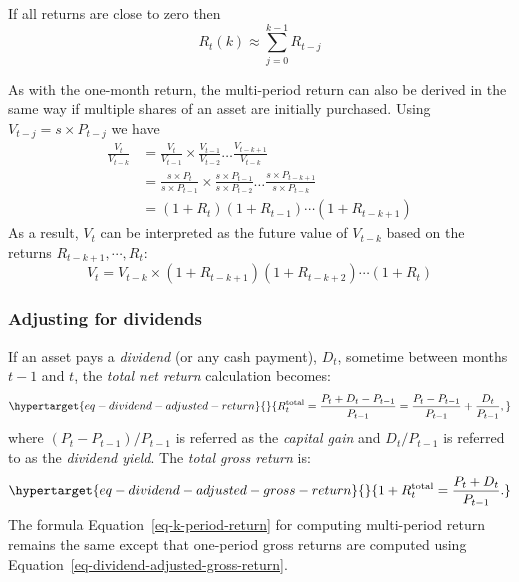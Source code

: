 \documentclass[
  letterpaper,
  DIV=11,
  numbers=noendperiod]{scrreprt}
\theoremstyle{definition}
\theoremstyle{definition}
\theoremstyle{remark}
\begin{document}
If all returns are close to zero then
\[R_{t}(k) \approx \sum_{j=0}^{k-1} R_{t-j}\]

As with the one-month return, the multi-period return can also be
derived in the same way if multiple shares of an asset are initially
purchased. Using \(V_{t-j} = s \times P_{t-j}\) we have \begin{align}
\frac{V_{t}}{V_{t-k}} &= \frac{V_{t}}{V_{t-1}} \times \frac{V_{t-1}}{V_{t-2}} \ldots \frac{V_{t-k+1}}{V_{t-k}} \\
&= \frac{s\times P_{t}}{s\times P_{t-1}} \times \frac{s\times P_{t-1}}{s\times P_{t-2}} \ldots \frac{s\times P_{t-k+1}}{s\times P_{t-k}} \\
&= (1+R_{t})(1+R_{t-1})\cdots(1+R_{t-k+1})
\end{align} As a result, \(V_{t}\) can be interpreted as the future
value of \(V_{t-k}\) based on the returns \(R_{t-k+1}, \cdots, R_{t}\):
\[V_{t} = V_{t-k} \times (1+R_{t-k+1})(1+R_{t-k+2}) \cdots (1+R_{t})\]

\hypertarget{adjusting-for-dividends}{%
\subsubsection{Adjusting for dividends}\label{adjusting-for-dividends}}

If an asset pays a \emph{dividend} (or any cash
payment), \(D_{t}\), sometime between months \(t-1\) and \(t\), the
\emph{total net return} calculation becomes:
\begin{equation}\protect\hypertarget{eq-dividend-adjusted-return}{}{
R_{t}^{\textrm{total}}=\frac{P_{t}+D_{t}-P_{t-1}}{P_{t-1}}=\frac{P_{t}-P_{t-1}}{P_{t-1}}+\frac{D_{t}}{P_{t-1}},
}\label{eq-dividend-adjusted-return}\end{equation} where
\((P_{t}-P_{t-1})/P_{t-1}\) is referred as the \emph{capital gain}
 and \(D_{t}/P_{t-1}\) is referred to as the
\emph{dividend yield}. The \emph{total gross
return} is:
\begin{equation}\protect\hypertarget{eq-dividend-adjusted-gross-return}{}{
1+R_{t}^{\textrm{total}}=\frac{P_{t}+D_{t}}{P_{t-1}}.
}\label{eq-dividend-adjusted-gross-return}\end{equation} The formula
Equation~\ref{eq-k-period-return} for computing multi-period return
remains the same except that one-period gross returns are computed using
Equation~\ref{eq-dividend-adjusted-gross-return}.
\end{document}
